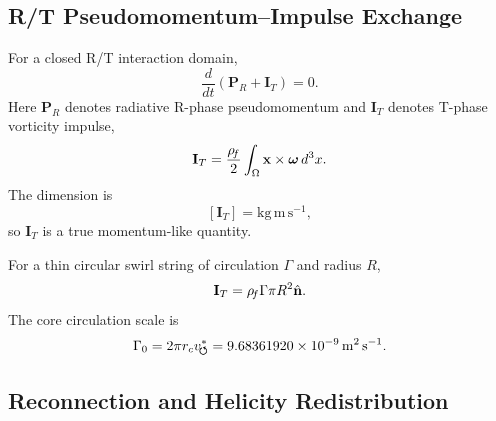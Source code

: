     \subsection{R/T Pseudomomentum--Impulse Exchange}
        
        For a closed R/T interaction domain,
        \[
            \frac{d}{dt}
            \left(
                \mathbf P_R+\mathbf I_T
            \right)
            =
            0.
        \]
        Here \(\mathbf P_R\) denotes radiative R-phase pseudomomentum and
        \(\mathbf I_T\) denotes T-phase vorticity impulse,
        \[
            \mathbf I_T
            =
            \frac{\rho_{\!f}}{2}
            \int_{\Omega}
            \mathbf x\times\boldsymbol\omega\,d^3x .
        \]
        The dimension is
        \[
            [\mathbf I_T]
            =
            \mathrm{kg\,m\,s^{-1}},
        \]
        so \(\mathbf I_T\) is a true momentum-like quantity.
        
        For a thin circular swirl string of circulation \(\Gamma\) and radius \(R\),
        \[
            \mathbf I_T
            =
            \rho_{\!f}\Gamma\pi R^2\hat{\mathbf n}.
        \]
        The core circulation scale is
        \[
            \Gamma_0
            =
            2\pi r_cv_{\!\boldsymbol{\circlearrowleft}}^{\ast}
            =
            9.68361920\times10^{-9}\,\mathrm{m^2\,s^{-1}}.
        \]
    
    \subsection{Reconnection and Helicity Redistribution}
        
